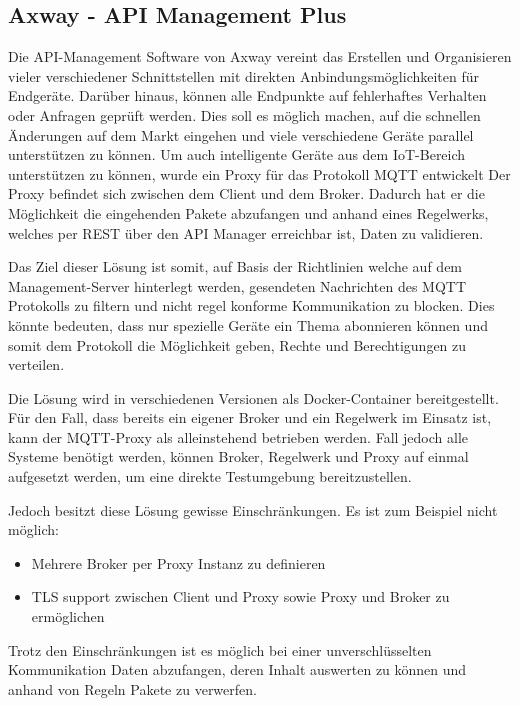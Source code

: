     \subsection{Axway - API Management Plus}
        Die API-Management Software von Axway vereint das Erstellen und Organisieren vieler verschiedener Schnittstellen mit direkten Anbindungsmöglichkeiten für Endgeräte. Darüber hinaus, können alle Endpunkte auf fehlerhaftes Verhalten oder Anfragen geprüft werden. Dies soll es möglich machen, auf die schnellen Änderungen auf dem Markt eingehen und viele verschiedene Geräte parallel unterstützen zu können.
        Um auch intelligente Geräte aus dem \ac{IoT}-Bereich unterstützen zu können, wurde ein Proxy für das Protokoll \ac{MQTT} entwickelt \cite{axway_2018} Der Proxy befindet sich zwischen dem Client und dem Broker. Dadurch hat er die Möglichkeit die eingehenden Pakete abzufangen und anhand eines Regelwerks, welches per REST über den API Manager erreichbar ist, Daten zu validieren.
        
        Das Ziel dieser Lösung ist somit, auf Basis der Richtlinien welche auf dem Management-Server hinterlegt werden, gesendeten Nachrichten des \ac{MQTT} Protokolls zu filtern und nicht regel konforme Kommunikation zu blocken. Dies könnte bedeuten, dass nur spezielle Geräte ein Thema abonnieren können und somit dem Protokoll die Möglichkeit geben, Rechte und Berechtigungen zu verteilen.
        
        Die Lösung wird in verschiedenen Versionen als Docker-Container bereitgestellt. Für den Fall, dass bereits ein eigener Broker und ein Regelwerk im Einsatz ist, kann der \ac{MQTT}-Proxy als alleinstehend betrieben werden. Fall jedoch alle Systeme benötigt werden, können Broker, Regelwerk und Proxy auf einmal aufgesetzt werden, um eine direkte Testumgebung bereitzustellen.
        
        Jedoch besitzt diese Lösung gewisse Einschränkungen.
        Es ist zum Beispiel nicht möglich:
        \begin{itemize}
            \item Mehrere Broker per Proxy Instanz zu definieren
            \item TLS support zwischen Client und Proxy sowie Proxy und Broker zu ermöglichen
        \end{itemize}
        
        Trotz den Einschränkungen ist es möglich bei einer unverschlüsselten Kommunikation Daten abzufangen, deren Inhalt auswerten zu können und anhand von Regeln Pakete zu verwerfen.
        
